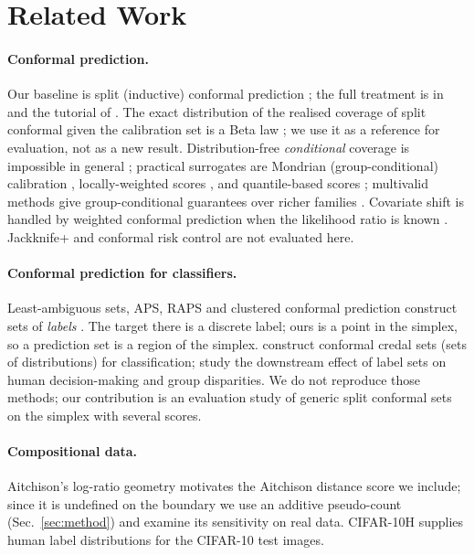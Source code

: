 \section{Related Work}
\paragraph{Conformal prediction.} Our baseline is split (inductive) conformal prediction \citep{papadopoulos2002inductive,lei2018distribution}; the full treatment is in \citet{vovk2005algorithmic} and the tutorial of \citet{angelopoulos2021gentle}. The exact distribution of the realised coverage of split conformal given the calibration set is a Beta law \citep{vovk2012conditional}; we use it as a reference for evaluation, not as a new result. Distribution-free \emph{conditional} coverage is impossible in general \citep{barber2021limits}; practical surrogates are Mondrian (group-conditional) calibration \citep{vovk2005algorithmic,ding2023class}, locally-weighted scores \citep{lei2018distribution}, and quantile-based scores \citep{romano2019conformalized}; multivalid methods give group-conditional guarantees over richer families \citep{jung2022batch}. Covariate shift is handled by weighted conformal prediction when the likelihood ratio is known \citep{tibshirani2019covariate}. Jackknife+ \citep{barber2021jackknife} and conformal risk control \citep{angelopoulos2022conformal} are not evaluated here.
\paragraph{Conformal prediction for classifiers.} Least-ambiguous sets, APS, RAPS and clustered conformal prediction construct sets of \emph{labels} \citep{sadinle2019least,romano2020classification,angelopoulos2021uncertainty,ding2023class}. The target there is a discrete label; ours is a point in the simplex, so a prediction set is a region of the simplex. \citet{javanmardi2024conformalized} construct conformal credal sets (sets of distributions) for classification; \citet{cresswell2024disparate} study the downstream effect of label sets on human decision-making and group disparities. We do not reproduce those methods; our contribution is an evaluation study of generic split conformal sets on the simplex with several scores.
\paragraph{Compositional data.} Aitchison's log-ratio geometry \citep{aitchison1982statistical} motivates the Aitchison distance score we include; since it is undefined on the boundary we use an additive pseudo-count (Sec.~\ref{sec:method}) and examine its sensitivity on real data. CIFAR-10H \citep{peterson2019human} supplies human label distributions for the CIFAR-10 \citep{krizhevsky2009learning} test images.

